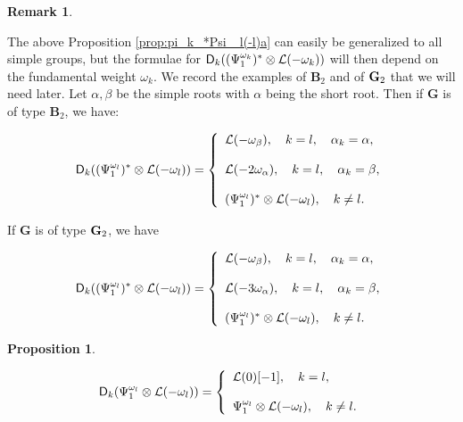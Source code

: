 \documentclass[sn-mathphys-num]{sn-jnl}%
\newcommand{\Ll}{\mathcal L}
\newcommand{\bg}{\mathbf G}
\newcommand{\fb}{\mathbf B}
\newtheorem{proposition}[theorem]{Proposition}
\theoremstyle{definition}
\newtheorem{remark}[theorem]{Remark}
\begin{document}
\begin{remark}\label{rem:prop_pi_k_*Psi _l(-l)_othertypes}
{The above Proposition \ref{prop:pi_k_*Psi _l(-l)a} can easily be generalized to all simple groups, but the formulae for ${\sf D}_k((\Psi _1^{\omega _k})^{\ast}\otimes \Ll (-\omega _k))$ will then depend on the fundamental weight $\omega _k$. We record the examples of ${\fb}_2$ and of ${ \bf G}_2$ that we will need later. Let $\alpha, \beta$ be the simple roots with $\alpha$ being the short root. Then if $ \bg$ is of type ${\fb}_2$, we have:

\begin{equation}\label{eq:pi_k_*Psi _l(-l)c}
{\sf D}_k((\Psi _1^{\omega _l})^{\ast}\otimes \Ll (-\omega _l))=\left\{
   \begin{array}{l}
    \Ll (-\omega _{\beta}), \quad k=l, \quad \alpha _k=\alpha,\\
    \\
    \Ll (-2\omega _{\alpha}), \quad k=l, \quad \alpha _k=\beta,\\
    \\
    (\Psi _1^{\omega _l})^{\ast}\otimes \Ll (-\omega _l), \quad k\neq l. \\
   \end{array}
  \right.
\end{equation}

If $ \bg$ is of type ${\bf G}_2$, we have 

\begin{equation}\label{eq:pi_k_*Psi _l(-l)d}
{\sf D}_k((\Psi _1^{\omega _l})^{\ast}\otimes \Ll (-\omega _l))=\left\{
   \begin{array}{l}
    \Ll (-\omega _{\beta}), \quad k=l, \quad \alpha _k=\alpha,\\
    \\
    \Ll (-3\omega _{\alpha}), \quad k=l, \quad \alpha _k=\beta,\\
    \\
    (\Psi _1^{\omega _l})^{\ast}\otimes \Ll (-\omega _l), \quad k\neq l. \\
   \end{array}
  \right.
\end{equation}
}
\end{remark}

\begin{proposition}\label{prop:pi_k_*Psi _k(-omega_k)}

\begin{equation}\label{eq:D_kPsi _lb}
{\sf D}_k(\Psi _1^{\omega _l}\otimes \Ll (-\omega _l))=\left\{
   \begin{array}{l}
    \Ll (0)[-1], \quad k=l,\\
    \\
    \Psi _1^{\omega _l}\otimes \Ll (-\omega _l), \quad k\neq l. \\
   \end{array}
  \right.
\end{equation}
\end{proposition}
\end{document}
